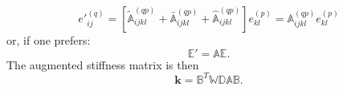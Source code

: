 \documentclass[11pt]{article} %
\begin{document}
\begin{equation}
	e'^{(q)}_{ij} = \left[ \tilde{\mathbb{A}}^{(qp)}_{ijkl} + \bar{\mathbb{A}}^{(qp)}_{ijkl} + \hat{\mathbb{A}}^{(qp)}_{ijkl} \right] e_{kl}^{(p)} = \mathbb{A}^{(qp)}_{ijkl} e_{kl}^{(p)}
\end{equation}
or, if one prefers:
\begin{equation}
	\mathbb{E}' = \mathbb{A} \mathbb{E}.
\end{equation}
The augmented stiffness matrix is then
\begin{equation}
	\mathbf{k} = \mathbb{B}^T \mathbb{W} \mathbb{D} \mathbb{A} \mathbb{B}.
\end{equation}
\end{document}

